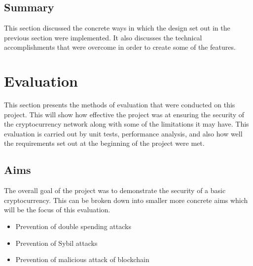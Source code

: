 \documentclass{l4proj}
\begin{document}
\section{Summary}
This section discussed the concrete ways in which the design set out in the previous section were implemented.
It also discusses the technical accomplishments that were overcome in order to create some of the features.

\chapter{Evaluation} 
This section presents the methods of evaluation that were conducted on this project. This will show how effective the
project was at ensuring the security of the cryptocurrency network along with some of the limitations it may have. 
This evaluation is carried out by unit tests, performance analysis, and also how well the requirements set out at 
the beginning of the project were met.




\section{Aims}
The overall goal of the project was to demonstrate the security of a basic cryptocurrency. This can be broken down into
smaller more concrete aims which will be the focus of this evaluation.
\begin{itemize}
    \item Prevention of double spending attacks
    \item Prevention of Sybil attacks
    \item Prevention of malicious attack of blockchain
\end{itemize}
\end{document}
